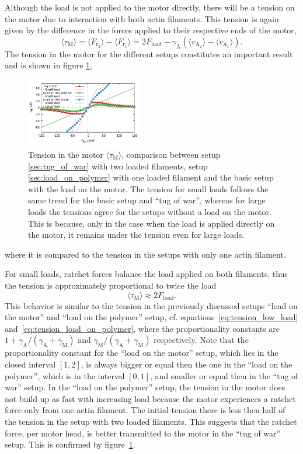 \documentclass[aps,pre,twocolumn,showpacs,showkeys,superscriptaddress,floatfix]{revtex4-1}
\begin{document}
Although the load is not applied to the motor directly,
there will be a tension on the motor due to interaction with both actin filaments. 
This tension is again given by the difference in the forces applied to their respective ends of the motor,
\begin{equation}
\langle \tau_\text{M} \rangle
= \langle F_{\text{r}_2}\rangle - \langle F_{\text{r}_1}\rangle 
= 2 F_\text{load} - \gamma_\text{A} \left(\langle v_{\text{A}_2}\rangle - \langle v_{\text{A}_1}\rangle \right) .
\label{eq:tension_tug}
\end{equation}
The tension in the motor for the different setups constitutes an important result and is shown in figure \ref{fig:tug_F}, 
\begin{figure}[t]
\centering
\includegraphics[width=0.45\textwidth,height=!]{tug_F}
\caption{
\label{fig:tug_F}
Tension in the motor $\langle \tau_\text{M}\rangle$, comparison between setup \ref{sec:tug_of_war} with two loaded filaments, setup \ref{sec:load_on_polymer} with one loaded filament and the basic setup with the load on the motor. 
The tension for small loads follows the same trend for the basic setup and ``tug of war'', whereas for large loads the tensions agree for the setups without a load on the motor. 
This is because, only in the case when the load is applied directly on the motor, it remains under the tension even for large loads.
}
\end{figure}
where it is compared to the tension in the setups with only one actin filament.

For small loads, ratchet forces balance the load applied on both filaments, thus the tension is approximately proportional to twice the load 
\[
\langle \tau_\text{M} \rangle \approx 2 F_\text{load} .
\] 
This behavior is similar to the tension in the previously discussed setups  ``load on the motor'' and ``load on the polymer'' setup, cf. equations~\eqref{eq:tension_low_load} and~\eqref{eq:tension_load_on_polymer}, 
where the proportionality constants are $ 1 + \gamma_\text{A} / (\gamma_\text{A} + \gamma_\text{M} )$ and $\gamma_\text{M} / (\gamma_\text{A} + \gamma_\text{M} )$ respectively. 
Note that the proportionality constant for the ``load on the motor'' setup, which lies in the closed interval $[1,2]$, 
is always bigger or equal then the one in the ``load on the polymer'', which is in the interval $[0,1]$, and smaller or equal then in the ``tug of war'' setup. 
In the ``load on the polymer'' setup, the tension in the motor does not build up as fast with increasing load because the motor experiences a ratchet force only from one actin filament.
The initial tension there is less then half of the tension in the setup with two loaded filaments.
This suggests that the ratchet force, per motor head, is better transmitted to the motor in the ``tug of war'' setup.
This is confirmed by figure~\ref{fig:tug_F}.
\end{document}
